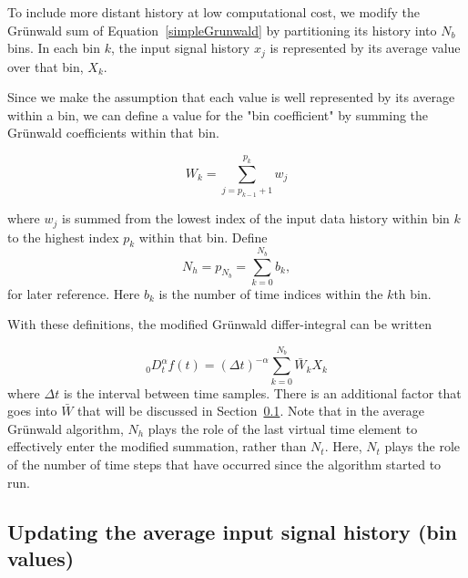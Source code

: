 To include more distant history at low computational cost, we modify
the Gr{\"u}nwald sum of Equation~\ref{simpleGrunwald} by partitioning its
history into $N_b$ bins. In each bin $k$, the input signal history
$x_j$ is represented by its average value over that bin, $X_k$.

Since we make the assumption that each value is well represented by
its average within a bin, we can define a value for the "bin
coefficient" by summing the Gr{\"u}nwald coefficients within that bin.

\begin{equation}
W_k = \displaystyle\sum\limits_{j=p_{k-1}+1}^{p_k} w_j
\label{eqn:sumWk}
\end{equation}

\noindent where $w_j$ is summed from the lowest index of the input data history within bin $k$ to the highest index $p_k$ within that bin. Define
\begin{equation}
N_h=p_{N_b}=\displaystyle\sum_{k=0}^{N_b}b_k,
\label{eqn:Nh}
\end{equation}
for later reference. Here $b_k$ is the number of time indices within the $k$th bin. 

With these definitions, the modified Gr{\"u}nwald differ-integral can be written

\begin{equation}
_0D^\alpha_t f(t) = \displaystyle(\Delta t)^{-\alpha}\sum\limits_{k=0}^{N_b}\bar{W}_kX_k
\label{avgSimpleGrunwald}
\end{equation}
where $\Delta t$ is the interval between time samples. There is an additional factor that goes into $\bar{W}$ that will be discussed in Section~\ref{sec:shifting}. Note that in the average Gr{\"u}nwald algorithm, $N_h$ plays the role of the last virtual time element to effectively enter the modified summation, rather than $N_t$. Here, $N_t$ plays the role of the number of time steps that have occurred since the algorithm started to run. 



\subsection{Updating the average input signal history (bin values)}
\label{sec:shifting}


